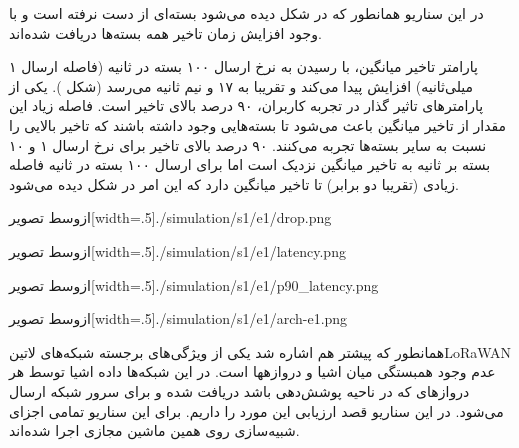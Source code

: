 در این سناریو همانطور که در شکل 
دیده می‌شود بسته‌ای از دست نرفته است و با وجود افزایش زمان تاخیر همه بسته‌ها دریافت شده‌اند.

پارامتر تاخیر میانگین، با رسیدن به نرخ ارسال ۱۰۰ بسته در ثانیه (فاصله ارسال ۱ میلی‌ثانیه) افزایش پیدا می‌کند و
تقریبا به ۱۷ و نیم ثانیه می‌رسد (شکل ).
یکی از پارامترهای تاثیر گذار در تجربه کاربران، ۹۰ درصد بالای تاخیر است.
فاصله زیاد این مقدار از تاخیر میانگین باعث می‌شود تا بسته‌هایی وجود داشته باشند که تاخیر بالایی را نسبت به سایر بسته‌ها تجربه می‌کنند.
۹۰ درصد بالای تاخیر برای نرخ ارسال ۱ و ۱۰ بسته بر ثانیه به تاخیر میانگین نزدیک است اما برای ارسال ۱۰۰ بسته در ثانیه فاصله زیادی (تقریبا دو برابر) تا تاخیر میانگین دارد که این امر
در شکل  دیده می‌شود.

‌ازوسط
‌تصویر[width=.5\textwidth]{./simulation/s1/e1/drop.png}

‌ازوسط
‌تصویر[width=.5\textwidth]{./simulation/s1/e1/latency.png}

‌ازوسط
‌تصویر[width=.5\textwidth]{./simulation/s1/e1/p90_latency.png}

‌ازوسط
‌تصویر[width=.5\textwidth]{./simulation/s1/e1/arch-e1.png}


همانطور که پیشتر هم اشاره شد یکی از ویژگی‌های برجسته شبکه‌های ‌لاتین{LoRaWAN} عدم وجود
همبستگی میان اشیا و دروازهها است. در این شبکه‌ها داده اشیا توسط هر دروازهای
که در ناحیه پوشش‌دهی باشد دریافت شده و برای سرور شبکه ارسال می‌شود.
در این سناریو قصد ارزیابی این مورد را داریم.
برای این سناریو تمامی اجزای شبیه‌سازی روی همین ماشین مجازی اجرا شده‌اند.

